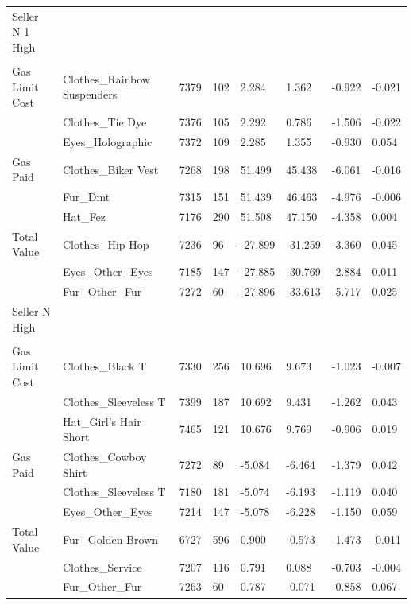 \begin{table}
\begin{tabular}{llllllll}
Seller N-1 High &  &  &  &  &  &  & \\
 &  &  &  &  &  &  & \\
Gas Limit Cost & Clothes\_Rainbow Suspenders & 7379 & 102 & 2.284 & 1.362 & -0.922 & -0.021\\
 & Clothes\_Tie Dye & 7376 & 105 & 2.292 & 0.786 & -1.506 & -0.022\\
 & Eyes\_Holographic & 7372 & 109 & 2.285 & 1.355 & -0.930 & 0.054\\
Gas Paid & Clothes\_Biker Vest & 7268 & 198 & 51.499 & 45.438 & -6.061 & -0.016\\
 & Fur\_Dmt & 7315 & 151 & 51.439 & 46.463 & -4.976 & -0.006\\
 & Hat\_Fez & 7176 & 290 & 51.508 & 47.150 & -4.358 & 0.004\\
Total Value & Clothes\_Hip Hop & 7236 & 96 & -27.899 & -31.259 & -3.360 & 0.045\\
 & Eyes\_Other\_Eyes & 7185 & 147 & -27.885 & -30.769 & -2.884 & 0.011\\
 & Fur\_Other\_Fur & 7272 & 60 & -27.896 & -33.613 & -5.717 & 0.025\\
Seller N High &  &  &  &  &  &  & \\
 &  &  &  &  &  &  & \\
Gas Limit Cost & Clothes\_Black T & 7330 & 256 & 10.696 & 9.673 & -1.023 & -0.007\\
 & Clothes\_Sleeveless T & 7399 & 187 & 10.692 & 9.431 & -1.262 & 0.043\\
 & Hat\_Girl's Hair Short & 7465 & 121 & 10.676 & 9.769 & -0.906 & 0.019\\
Gas Paid & Clothes\_Cowboy Shirt & 7272 & 89 & -5.084 & -6.464 & -1.379 & 0.042\\
 & Clothes\_Sleeveless T & 7180 & 181 & -5.074 & -6.193 & -1.119 & 0.040\\
 & Eyes\_Other\_Eyes & 7214 & 147 & -5.078 & -6.228 & -1.150 & 0.059\\
Total Value & Fur\_Golden Brown & 6727 & 596 & 0.900 & -0.573 & -1.473 & -0.011\\
 & Clothes\_Service & 7207 & 116 & 0.791 & 0.088 & -0.703 & -0.004\\
 & Fur\_Other\_Fur & 7263 & 60 & 0.787 & -0.071 & -0.858 & 0.067\\
\bottomrule
\end{tabular}
\end{table}
